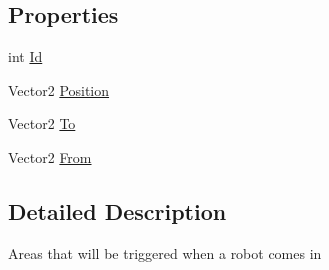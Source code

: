 \subsection*{Properties}
\begin{DoxyCompactItemize}
\item 
int \hyperlink{classgearit_1_1src_1_1map_1_1_trigger_a31311392633427b030fa12e00de0593e}{Id}
\item 
Vector2 \hyperlink{classgearit_1_1src_1_1map_1_1_trigger_af8fb981eb74c809530dedcd3cf0d23c1}{Position}
\item 
Vector2 \hyperlink{classgearit_1_1src_1_1map_1_1_trigger_a2add605485213c4842fda9b9994a5a63}{To}
\item 
Vector2 \hyperlink{classgearit_1_1src_1_1map_1_1_trigger_a898cd64b9b1f8a61297f7d64f3d16d41}{From}
\end{DoxyCompactItemize}


\subsection{Detailed Description}
Areas that will be triggered when a robot comes in 



